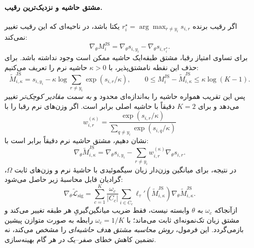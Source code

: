 \paragraph{مشتق حاشیه و نزدیک‌ترین رقیب.}
اگر رقیب برنده
$r_i^\star=\arg\max_{r\ne y_i}s_{i,r}$
یکتا باشد، در ناحیه‌ای
که این رقیب تغییر نمی‌کند:
\begin{equation}\label{cmp:eq:ch3-margin-policy-gradient}
\boxed{
\nabla_\theta M_i^{\mathrm{JS}}
=\nabla_\theta s_{i,y_i}
-\nabla_\theta s_{i,r_i^\star}.
}
\end{equation}
برای تساوی امتیاز رقبا،
مشتق طبقه‌ایک حاشیه ممکن
است وجود نداشته باشد.
برای حذف این نقطه نامشتق‌پذیر،
با $\kappa>0$ حاشیه نرم
را تعریف می‌کنیم:
\begin{equation}\label{cmp:eq:ch3-margin-smooth-competitor}
\boxed{
\widetilde M_{i,\kappa}^{\mathrm{JS}}
=s_{i,y_i}
-\kappa\log\sum_{r\ne y_i}
\exp(s_{i,r}/\kappa),
\qquad
0\le M_i^{\mathrm{JS}}
-\widetilde M_{i,\kappa}^{\mathrm{JS}}
\le\kappa\log(K-1).
}
\end{equation}
پس این تقریب همواره
حاشیه را به‌اندازه‌ای
محدود و \emph{به سمت
مقادیر کوچک‌تر} تغییر
می‌دهد و برای $K=2$
دقیقاً با حاشیه اصلی
برابر است. اگر وزن‌های
نرم رقبا را با
\[
w_{i,r}^{(\kappa)}
=\frac{\exp(s_{i,r}/\kappa)}
{\sum_{q\ne y_i}\exp(s_{i,q}/\kappa)}
\]
نشان دهیم، مشتق حاشیه
نرم دقیقاً برابر است با:
\begin{equation}\label{cmp:eq:ch3-margin-smooth-gradient}
\boxed{
\nabla_\theta\widetilde M_{i,\kappa}^{\mathrm{JS}}
=\nabla_\theta s_{i,y_i}
-\sum_{r\ne y_i}
w_{i,r}^{(\kappa)}
\nabla_\theta s_{i,r}.
}
\end{equation}
در نتیجه، برای میانگین
وزن‌دار زیان سیگموئیدی
با حاشیهٔ نرم و وزن‌های ثابت $\Omega$، گرادیان
قابل محاسبهٔ زیر حاصل
می‌شود:
\begin{equation}\label{cmp:eq:ch3-margin-loss-policy-gradient}
\boxed{
\nabla_\theta\widetilde{\mathcal L}_{\mathrm{sig}}
=\sum_{c=1}^{K}\frac{\omega_c}{|C_c|}
\sum_{i\in C_c}
\ell_\tau'\!\left(\widetilde M_{i,\kappa}^{\mathrm{JS}}\right)
\nabla_\theta\widetilde M_{i,\kappa}^{\mathrm{JS}}.
}
\end{equation}
ازآنجاکه $\omega_c$ به $\theta$ وابسته نیست، فقط ضریب میانگین‌گیریِ هر طبقه تغییر می‌کند و مشتق زیان تک‌نمونه‌ای ثابت می‌ماند؛ با $\omega_c=1/K$ رابطه به صورت متوازن پیشین بازمی‌گردد.
این فرمول،
\emph{روش محاسبه مشتق
هدف حاشیه‌ای} را مشخص
می‌کند، نه تضمین کاهش
خطای صفر--یک در هر
گام بهینه‌سازی.

